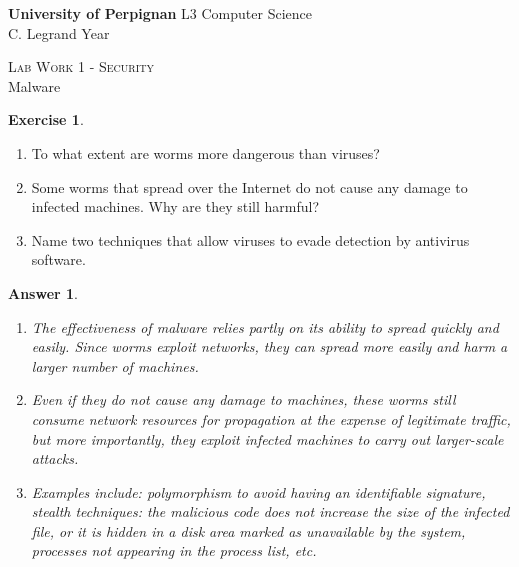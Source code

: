 \documentclass[a4paper,11pt]{article}
\theoremstyle{plain}
\newtheorem{correction}{Answer}
\theoremstyle{definition}
\newtheorem{exercice}{Exercise}
\begin{document}
\hbox{}
\noindent \textbf{University of Perpignan} \hfill  L3 Computer Science \\
 \hfill C. Legrand \hfill  Year \the\year \\
\smallskip
\begin{center}
{
  {\scshape \large Lab Work 1 - Security}  \\
 Malware
}



\end{center}
\hbox{}

\bigskip

\bigskip


\begin{exercice}
\begin{enumerate}
\item To what extent are worms more dangerous than viruses?
\item Some worms that spread over the Internet do not cause any damage to infected machines. Why are they still harmful?
\item Name two techniques that allow viruses to evade detection by antivirus software.
\end{enumerate}
\end{exercice}

\begin{correction}
\begin{enumerate}
\item The effectiveness of malware relies partly on its ability to spread quickly and easily. Since worms exploit networks, they can spread more easily and harm a larger number of machines.
\item Even if they do not cause any damage to machines, these worms still consume network resources for propagation at the expense of legitimate traffic, but more importantly, they exploit infected machines to carry out larger-scale attacks.
\item Examples include: polymorphism to avoid having an identifiable \textit{signature}, stealth techniques: the malicious code does not increase the size of the infected file, or it is hidden in a disk area marked as unavailable by the system, processes not appearing in the process list, etc.
\end{enumerate}
\end{correction}
\end{document}
